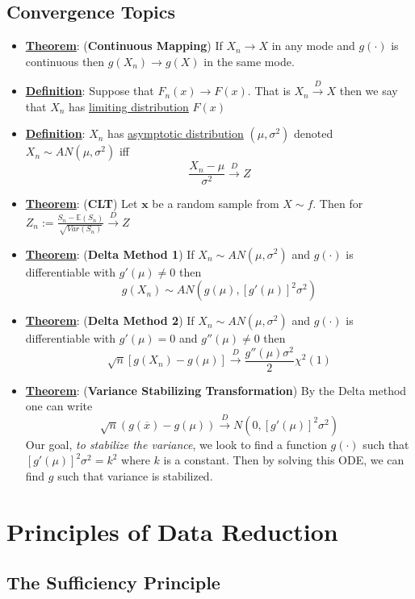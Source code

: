 \documentclass{article}
\newcommand{\E}{{\mathbb{E}}}
\newcommand{\x}{{\textbf{x}}}
\begin{document}
\subsection{Convergence Topics}
\begin{itemize}
\item \underline{\textbf{Theorem}}: (\textbf{Continuous Mapping}) If $X_n \to X$ in any mode and $g(\cdot)$ is continuous then $g(X_n)\to g(X)$ in the same mode. 
\item \underline{\textbf{Definition}}: Suppose that $F_n(x)\to F(x)$. That is $X_n\overset{D}{\longrightarrow}X$ then we say that $X_n$ has \underline{limiting distribution} $F(x)$
\item \underline{\textbf{Definition}}: $X_n$ has \underline{asymptotic distribution} $(\mu, \sigma^2)$ denoted $X_n \sim AN(\mu, \sigma^2)$ iff $$\frac{X_n - \mu}{\sigma^2}\overset{D}{\longrightarrow}Z$$
\item\underline{\textbf{Theorem}}: (\textbf{CLT}) Let $\x$ be a random sample from $X\sim f$. Then for $Z_n := \frac{S_n - \E(S_n)}{\sqrt{Var(S_n)}}\overset{D}{\longrightarrow}Z$
\item \underline{\textbf{Theorem}}: (\textbf{Delta Method 1}) If $X_n \sim AN(\mu, \sigma^2)$ and $g(\cdot)$ is differentiable with $g'(\mu)\neq 0$ then $$g(X_n)\sim AN(g(\mu), [g'(\mu)]^2\sigma^2)$$
\item \underline{\textbf{Theorem}}: (\textbf{Delta Method 2}) If $X_n \sim AN(\mu, \sigma^2)$ and $g(\cdot)$ is differentiable with $g'(\mu)= 0$ and $g''(\mu)\neq 0$ then $$\sqrt{n}[g(X_n) - g(\mu)]\overset{D}{\longrightarrow}\frac{g''(\mu)\sigma^2}{2}\chi^2(1)$$
\item \underline{\textbf{Theorem}}: (\textbf{Variance Stabilizing Transformation}) By the Delta method one can write $$\sqrt{n}(g(\overline{x}) - g(\mu))\overset{D}{\longrightarrow} N(0,[g'(\mu)]^2\sigma^2)$$ Our goal, \textit{to stabilize the variance}, we look to find a function $g(\cdot)$ such that $[g'(\mu)]^2\sigma^2 = k^2$ where $k$ is a constant. Then by solving this ODE, we can find $g$ such that variance is stabilized. 
\end{itemize}


\section{Principles of Data Reduction}%

\subsection{The Sufficiency Principle}
\end{document}
